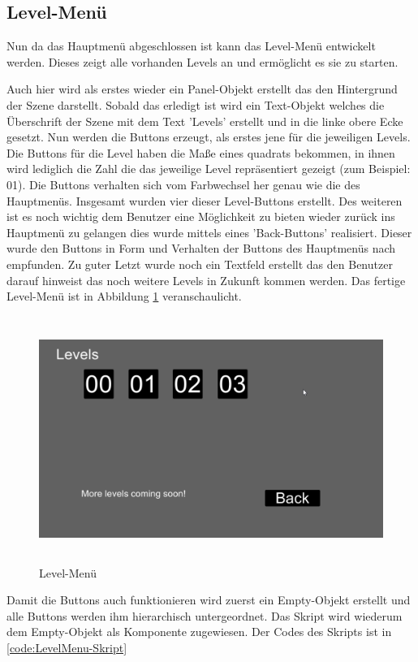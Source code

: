 \subsection{Level-Menü}
Nun da das Hauptmenü abgeschlossen ist kann das Level-Menü entwickelt werden. Dieses zeigt alle vorhanden Levels an und ermöglicht es sie zu starten. 

Auch hier wird als erstes wieder ein Panel-Objekt erstellt das den Hintergrund der Szene darstellt. Sobald das erledigt ist wird ein Text-Objekt welches die Überschrift der Szene mit dem Text 'Levels' erstellt und in die linke obere Ecke gesetzt. Nun werden die Buttons erzeugt, als erstes jene für die jeweiligen Levels. Die Buttons für die Level haben die Maße eines quadrats bekommen, in ihnen wird lediglich die Zahl die das jeweilige Level repräsentiert gezeigt (zum Beispiel: 01). Die Buttons verhalten sich vom Farbwechsel her genau wie die des Hauptmenüs. Insgesamt wurden vier dieser Level-Buttons erstellt. Des weiteren ist es noch wichtig dem Benutzer eine Möglichkeit zu bieten wieder zurück ins Hauptmenü zu gelangen dies wurde mittels eines 'Back-Buttons' realisiert. Dieser wurde den Buttons in Form und Verhalten der Buttons des Hauptmenüs nach empfunden. Zu guter Letzt wurde noch ein Textfeld erstellt das den Benutzer darauf hinweist das noch weitere Levels in Zukunft kommen werden. Das fertige Level-Menü ist in Abbildung \ref{Levelmenu} veranschaulicht.

\begin{figure}[H]
	\includegraphics[height=8cm]{images/Levelmenu.png}
	\caption{Level-Menü}
	\label{Levelmenu}
\end{figure}

Damit die Buttons auch funktionieren wird zuerst ein Empty-Objekt erstellt und alle Buttons werden ihm hierarchisch untergeordnet. Das Skript wird wiederum dem Empty-Objekt als Komponente zugewiesen. Der Codes des Skripts ist in \cref{code:LevelMenu-Skript}

